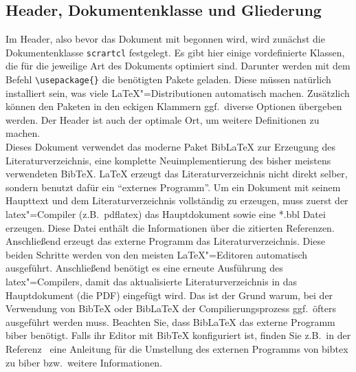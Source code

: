 \subsection{Header, Dokumentenklasse und Gliederung}
\label{subsec:DokHeadGli}
Im Header, also bevor das Dokument mit \verb++ begonnen wird, wird zunächst die Dokumentenklasse \verb+scrartcl+ festgelegt. Es gibt hier einige vordefinierte Klassen, die für die jeweilige Art des Dokuments optimiert sind. Darunter werden mit dem Befehl \verb+\usepackage{}+ die benötigten Pakete geladen. Diese müssen natürlich installiert sein, was viele \LaTeX"=Distributionen automatisch machen. Zusätzlich können den Paketen in den eckigen Klammern ggf.\ diverse Optionen übergeben werden. Der Header ist auch der optimale Ort, um weitere Definitionen zu machen.\\
Dieses Dokument verwendet das moderne Paket BibLaTeX zur Erzeugung des Literaturverzeichnis, eine komplette Neuimplementierung des bisher meistens verwendeten BibTeX. \LaTeX{} erzeugt das Literaturverzeichnis nicht direkt selber, sondern benutzt dafür ein "`externes Programm"'. Um ein Dokument mit seinem Haupttext und dem Literaturverzeichnis vollständig zu erzeugen, muss zuerst der latex"=Compiler (z.B.\ pdflatex) das Hauptdokument sowie eine *.bbl Datei erzeugen. Diese Datei enthält die Informationen über die zitierten Referenzen. Anschließend erzeugt das externe Programm das Literaturverzeichnis. Diese beiden Schritte werden von den meisten \LaTeX"=Editoren automatisch ausgeführt. Anschließend benötigt es eine erneute Ausführung des latex"=Compilers, damit das aktualisierte Literaturverzeichnis in das Hauptdokument (die PDF) eingefügt wird. Das ist der Grund warum, bei der Verwendung von BibTeX oder BibLaTeX der Compilierungsprozess ggf.\ öfters ausgeführt werden muss. Beachten Sie, dass BibLaTeX das externe Programm biber benötigt. Falls ihr Editor mit BibTeX konfiguriert ist, finden Sie z.B.\ in der Referenz~\cite{bibtextobiber,biblatex} eine Anleitung für die Umstellung des externen Programms von bibtex zu biber bzw.\ weitere Informationen.\\
